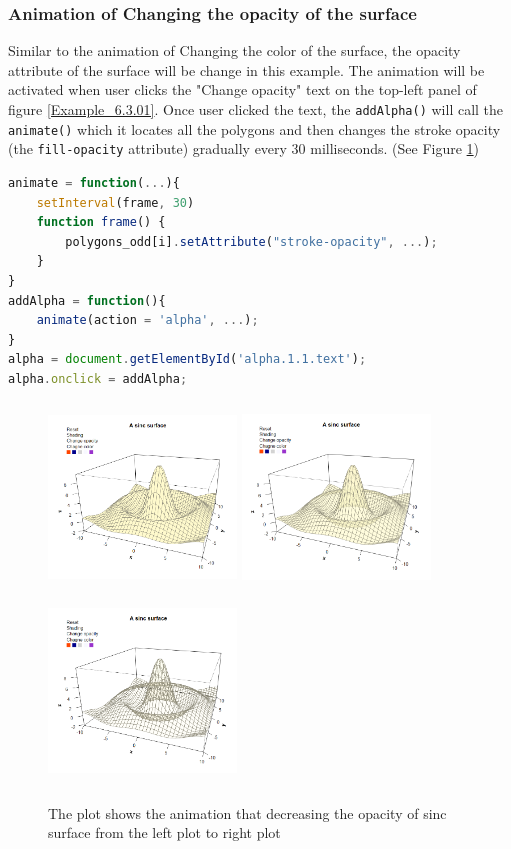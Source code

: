 \documentclass[11pt]{report}
\begin{document}
\newpage
\subsubsection*{Animation of Changing the opacity of the surface}
Similar to the animation of Changing the color of the surface, the opacity attribute of the surface will be change in this example. The animation will be activated when user clicks the "Change opacity" text on the top-left panel of figure \ref{Example_6.3.01}. Once user clicked the text, the \texttt{addAlpha()} will call the \texttt{animate()} which it locates all the polygons and then changes the stroke opacity (the \texttt{fill-opacity} attribute) gradually every 30 milliseconds. (See Figure \ref{Example_6.3.2})
\begin{lstlisting}[language = JavaScript]
animate = function(...){
    setInterval(frame, 30)
    function frame() {
        polygons_odd[i].setAttribute("stroke-opacity", ...);
    }
}
addAlpha = function(){
    animate(action = 'alpha', ...);
}
alpha = document.getElementById('alpha.1.1.text');
alpha.onclick = addAlpha; 
\end{lstlisting}

\begin{figure}[h]
	\begin{center}
		\includegraphics[height = 5cm, width = 5cm]{figure/svg/origin_1.PNG}
		\includegraphics[height = 5cm, width = 5cm]{figure/svg/opacity_2.PNG}
		\includegraphics[height = 5cm, width = 5cm]{figure/svg/opacity_3.PNG}
		\caption{The plot shows the animation that decreasing the opacity of sinc surface from the left plot to right plot}
		\label{Example_6.3.2}
	\end{center}
\end{figure}
\end{document}
